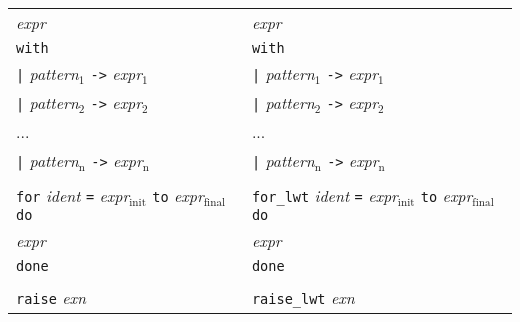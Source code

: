 \begin{tabular}{p{}p{}}
 \emph{ expr}                                                                        & \emph{ expr}                                                                            \\
 {\tt with}                                                                       & {\tt with}                                                                           \\
 \emph{ } {\tt |} \emph{pattern$_{\mbox{1}}$} {\tt ->} \emph{expr$_{\mbox{1}}$}                            & \emph{ } {\tt |} \emph{pattern$_{\mbox{1}}$} {\tt ->} \emph{expr$_{\mbox{1}}$}                                \\
 \emph{ } {\tt |} \emph{pattern$_{\mbox{2}}$} {\tt ->} \emph{expr$_{\mbox{2}}$}                            & \emph{ } {\tt |} \emph{pattern$_{\mbox{2}}$} {\tt ->} \emph{expr$_{\mbox{2}}$}                                \\
 \emph{ } ...                                                                        & \emph{ } ...                                                                            \\
 \emph{ } {\tt |} \emph{pattern$_{\mbox{n}}$} {\tt ->} \emph{expr$_{\mbox{n}}$}                            & \emph{ } {\tt |} \emph{pattern$_{\mbox{n}}$} {\tt ->} \emph{expr$_{\mbox{n}}$}                                \\
                                                                                  &                                                                                      \\
 {\tt for} \emph{ident} {\tt =} \emph{expr$_{\mbox{init}}$} {\tt to} \emph{expr$_{\mbox{final}}$} {\tt do} & {\tt for\_lwt} \emph{ident} {\tt =} \emph{expr$_{\mbox{init}}$} {\tt to} \emph{expr$_{\mbox{final}}$} {\tt do} \\
 \emph{ expr}                                                                        & \emph{ expr}                                                                            \\
 {\tt done}                                                                       & {\tt done}                                                                           \\
                                                                                  &                                                                                      \\
 {\tt raise} \emph{exn}                                                              & {\tt raise\_lwt} \emph{exn}                                                              \\

\end{tabular}
